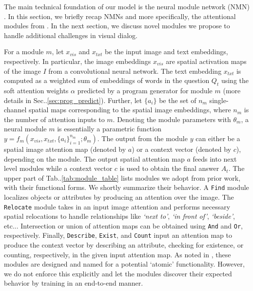 \documentclass[runningheads]{llncs}
\makeatletter
\DeclareRobustCommand\onedot{\futurelet\@let@token\@onedot}
\def\@onedot{\ifx\@let@token.\else.\null\fi\xspace}
\def\etc{etc\onedot} \def\vs{vs\onedot}
\def\Table{Tab\onedot}
\def\Sec{Sec\onedot}
\def\vs{vs\onedot}
\makeatother
\begin{document}
The main technical foundation of our model is the neural module network (NMN) \cite{andreas16cvpr}.
In this section, we briefly recap NMNs and more specifically, the attentional
modules from \cite{hu2017learning}.
In the next section, we discuss novel modules we propose to handle additional 
challenges in visual dialog.

For a module $m$, let $x_{vis}$ and $x_{txt}$ be the input image and text 
embeddings, respectively.
In particular, the image embeddings $x_{vis}$ are spatial activation
maps of the image $I$ from a convolutional neural network.
The text embedding $x_{txt}$ is computed as a weighted sum of embeddings
of words in the question $Q_t$ using the soft attention weights $\alpha$
predicted by a program generator for module $m$ (more details in 
\Sec\ref{sec:prog_predict}).
Further, let $\{a_i\}$ be the set of $n_m$ single-channel spatial maps 
corresponding to the spatial image embeddings, where $n_m$ is the number of
attention inputs to $m$.
Denoting the module parameters with $\theta_m$, a neural module $m$ is 
essentially a parametric function 
$y = f_m(x_{vis}, x_{txt}, \{a_i\}_{i=1}^{n_m}; \theta_m)$.
The output from the module $y$ can either be a spatial image attention map 
(denoted by $a$) or a context vector (denoted by $c$), depending on the module.
The output spatial attention map $a$ feeds into next level modules while a context 
vector $c$ is used to obtain the final answer $A_t$.
The upper part of \Table\ref{tab:module_table} lists modules we adopt from 
prior work, with their functional forms.
We shortly summarize their behavior.
A \texttt{Find} module localizes objects or attributes by producing an 
attention over the image.
The \texttt{Relocate} module takes in an input image attention and performs
necessary spatial relocations to handle relationships like \textit{`next to'},
\textit{`in front of'}, \textit{`beside'}, \etc.
Intersection or union of attention maps can be obtained using \texttt{And} and \texttt{Or}, respectively.
Finally, \texttt{Describe}, \texttt{Exist}, and \texttt{Count} input an 
attention map to produce the context vector by describing an attribute, 
checking for existence, or counting, respectively, in the given input attention
map.
As noted in \cite{hu2017learning}, these modules are designed and named for
a potential `atomic' functionality.
However, we do not enforce this explicitly and let the modules discover their
expected behavior by training in an end-to-end manner.
\end{document}
